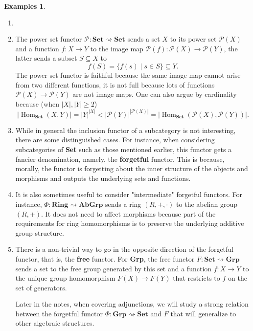 \documentclass{article}
\theoremstyle{definition}
\newtheorem{exmps}[thm]{Examples}
\theoremstyle{remark}
\newcommand{\mP}{\mathcal{P}}
\DeclareMathOperator{\Hom}{Hom}
\begin{document}
\begin{exmps}
	\begin{enumerate}
		\item[]
		\item The power set functor $\mP: \textbf{Set} \rightsquigarrow \textbf{Set}$ sends a set $X$ to its power set $\mP(X)$ and a function $f: X\rightarrow Y$ to the image map $\mP(f):\mP(X)\rightarrow \mP(Y)$, the latter sends a subset $S\subseteq X$ to \[f(S) = \{f(s) \mid s \in S\} \subseteq Y.\]
		The power set functor is faithful because the same image map cannot arise from two different functions, it is not full because lots of functions $\mP(X) \rightarrow \mP(Y)$ are not image maps. One can also argue by cardinality because (when $|X|, |Y| \geq 2$)
		\[|\Hom_{\textbf{Set}}(X,Y)| = |Y|^{|X|} < |\mP(Y)|^{|\mP(X)|} = |\Hom_{\textbf{Set}}(\mP(X), \mP(Y))|.\]
		\item While in general the inclusion functor of a subcategory is not interesting, there are some distinguished cases. For instance, when considering subcategories of \textbf{Set} such as those mentioned earlier, this functor gets a fancier denomination, namely, the \textbf{forgetful} functor. This is because, morally, the functor is forgetting about the inner structure of the objects and morphisms and outputs the underlying sets and functions.
		
		\item It is also sometimes useful to consider "intermediate" forgetful functors. For instance, $\Phi: \textbf{Ring} \rightsquigarrow \textbf{AbGrp}$ sends a ring $(R, +, \cdot)$ to the abelian group $(R, +)$. It does not need to affect morphisms because part of the requirements for ring homomorphisms is to preserve the underlying additive group structure.
		
		\item There is a non-trivial way to go in the opposite direction of the forgetful functor, that is, the \textbf{free} functor. For \textbf{Grp}, the free functor $F: \textbf{Set} \rightsquigarrow \textbf{Grp}$ sends a set to the free group generated by this set and a function $f: X\rightarrow Y$ to the unique group homomorphism $F(X) \rightarrow F(Y)$ that restricts to $f$ on the set of generators.
		
		Later in the notes, when covering adjunctions, we will study a strong relation between the forgetful functor $\Phi: \textbf{Grp} \rightsquigarrow \textbf{Set}$ and $F$ that will generalize to other algebraic structures.
		

\end{enumerate}
\end{exmps}
\end{document}
